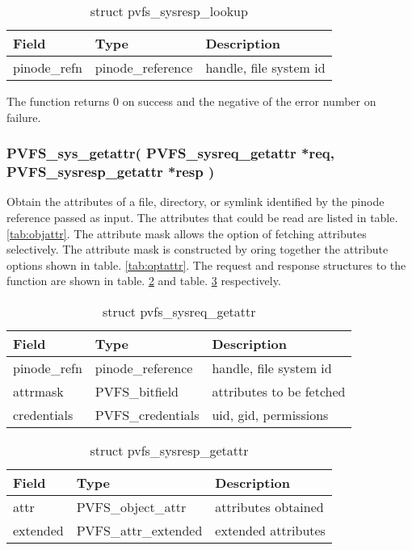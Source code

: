 \documentclass[11pt, letterpaper]{article}
\begin{document}
\begin{table}[H]
\begin{tabular}{|l|l|l|}
\hline
Field & Type & Description \\
\hline
\hline
pinode\_refn & pinode\_reference & handle, file system id \\
\hline
\end{tabular}
\caption{struct pvfs\_sysresp\_lookup}\label{tab:resplook}
\end{table}

The function returns 0 on success and the negative of the error number
on failure.

\subsubsection{PVFS\_sys\_getattr(
PVFS\_sysreq\_getattr *req,
PVFS\_sysresp\_getattr *resp
)}

Obtain the attributes of a file, directory, or symlink identified by
the pinode reference passed as input. The attributes that could be read
are listed in table. \ref{tab:objattr}. The attribute mask allows the 
option of fetching attributes selectively. The attribute mask is
constructed by oring together the attribute options shown in table.
\ref{tab:optattr}. The request and response structures to the function
are shown in table. \ref{tab:reqgattr} and table. \ref{tab:respgattr}
respectively.

\begin{table}[H]
\begin{tabular}{|l|l|l|}
\hline
Field & Type & Description \\
\hline
\hline
pinode\_refn & pinode\_reference & handle, file system id \\
\hline
attrmask & PVFS\_bitfield & attributes to be fetched \\
\hline
credentials & PVFS\_credentials & uid, gid, permissions \\
\hline
\end{tabular}
\caption{struct pvfs\_sysreq\_getattr}\label{tab:reqgattr}
\end{table}

\begin{table}[H]
\begin{tabular}{|l|l|l|}
\hline
Field & Type & Description \\
\hline
\hline
attr & PVFS\_object\_attr & attributes obtained \\
\hline
extended & PVFS\_attr\_extended & extended attributes \\ 
\hline
\end{tabular}
\caption{struct pvfs\_sysresp\_getattr}\label{tab:respgattr}
\end{table}
	
\end{document}
